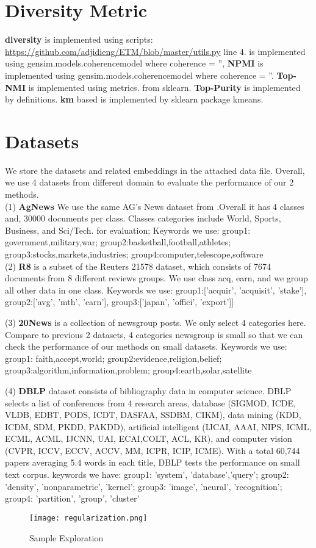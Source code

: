 \documentclass[11pt]{article}
\begin{document}
\section{Diversity Metric}
\label{appendix:metric}
\textbf{diversity} is implemented using scripts: \url{https://github.com/adjidieng/ETM/blob/master/utils.py} line 4. \textbf{} is implemented using  gensim.models.coherencemodel where coherence = '', \textbf{NPMI} is implemented using gensim.models.coherencemodel where coherence = ''. \textbf{Top-NMI} is implemented using metrics. from sklearn. \textbf{Top-Purity} is implemented by definitions. \textbf{km} based is implemented by sklearn package kmeans. 

\section{Datasets}
\label{appendix:dataset}
We store the datasets and related embeddings in the attached data file. 
Overall, we use 4 datasets from different domain to evaluate the performance of our 2 methods.\\ (1) \textbf{AgNews} We use the same AG’s News dataset from \cite{zhang2016characterlevel}.Overall it has 4 classes and, 30000 documents per class. Classes categories include World, Sports, Business, and Sci/Tech. 
for evaluation; 
Keywords we use: 
group1: government,military,war;
group2:basketball,football,athletes;
group3:stocks,markets,industries;
group4:computer,telescope,software
\\
(2) \textbf{R8} is a subset of the Reuters 21578 dataset, which consists of 7674 documents from 8 different reviews groups. We use class acq, earn, and we group all other data in one class. 
Keywords we use:
group1:['acquir', 'acquisit', 'stake'],
group2:['avg', 'mth', 'earn'],
group3:['japan', 'offici', 'export']]


(3) \textbf{20News} \cite{lang1995newsweeder} is a collection of newsgroup posts. We only select 4 categories here. Compare to previous 2 datasets, 4 categories newsgroup is small so that we can check the performance of our methods on small datasets. Keywords we use: group1: faith,accept,world;
group2:evidence,religion,belief;
group3:algorithm,information,problem;
group4:earth,solar,satellite

(4) \textbf{DBLP} \cite{DBLP:conf/ijcai/PanWZZW16} dataset consists of bibliography data in computer science. DBLP selects a list of conferences from 4 research areas, database (SIGMOD, ICDE, VLDB, EDBT, PODS, ICDT, DASFAA, SSDBM, CIKM), data mining (KDD, ICDM, SDM, PKDD, PAKDD), artificial intelligent (IJCAI, AAAI, NIPS, ICML, ECML, ACML, IJCNN, UAI, ECAI,COLT, ACL, KR), and computer vision (CVPR, ICCV, ECCV, ACCV, MM, ICPR, ICIP, ICME). With a total 60,744 papers averaging 5.4 words in each title, DBLP tests the performance on small text corpus. keywords we have: group1: 'system', 'database','query'; group2: 'density', 'nonparametric', 'kernel';
group3: 'image', 'neural', 'recognition'; group4: 'partition', 'group', 'cluster'
\begin{figure*}[h]
\centering
\texttt{[image: regularization.png]}

\caption{Sample Exploration}
\label{fig:22}
\end{figure*}
\end{document}
